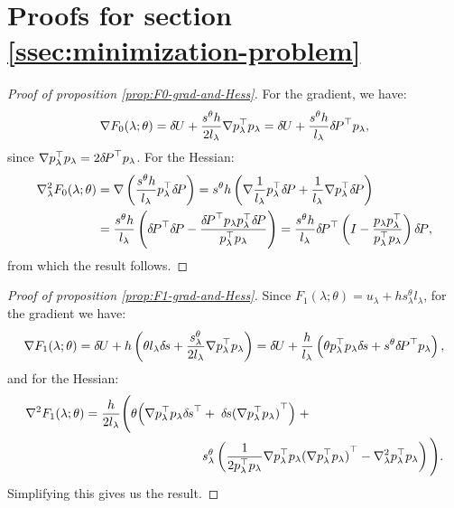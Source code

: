 \documentclass[smallcondensed]{svjour3}
\begin{document}
\section{Proofs for section\@
  \ref{ssec:minimization-problem}}\label{sec:minimization-proofs}

\begin{proof}[Proof of proposition \ref{prop:F0-grad-and-Hess}]
  For the gradient, we have:
  \begin{equation*}
    \nabla F_0(\lambda; \theta) = {\delta \hspace{-0.09em} U} + \frac{s^{\theta} h}{2 l_\lambda} \nabla p_\lambda^\top p_\lambda = {\delta \hspace{-0.09em} U} + \frac{s^{\theta} h}{l_\lambda} {\delta \hspace{-0.14em} P}^\top p_\lambda,
  \end{equation*}
  since
  $\nabla p_\lambda^\top p_\lambda = 2 {\delta \hspace{-0.14em} P}^\top
  p_\lambda$. For the Hessian:
  \begin{align*}
    \nabla^2_\lambda F_0(\lambda; \theta) &= \nabla \left(\frac{s^{\theta} h}{l_\lambda} p_\lambda^\top {\delta \hspace{-0.14em} P}\right) = s^{\theta} h \left(\nabla \frac{1}{l_\lambda} p_\lambda^\top {\delta \hspace{-0.14em} P} + \frac{1}{l_\lambda} \nabla p_\lambda^\top {\delta \hspace{-0.14em} P}\right) \\
    &= \frac{s^{\theta} h}{l_\lambda} \left({\delta \hspace{-0.14em} P}^\top {\delta \hspace{-0.14em} P} - \frac{{\delta \hspace{-0.14em} P}^\top p_\lambda p_\lambda^\top {\delta \hspace{-0.14em} P}}{p_\lambda^\top p_\lambda}\right) = \frac{s^{\theta} h}{l_\lambda} {\delta \hspace{-0.14em} P}^\top \left(I - \frac{p_\lambda p_\lambda^\top}{p_\lambda^\top p_\lambda}\right) {\delta \hspace{-0.14em} P},
  \end{align*}
  from which the result follows.
\end{proof}

\begin{proof}[Proof of proposition \ref{prop:F1-grad-and-Hess}]
  Since
  $F_1(\lambda; \theta) = u_\lambda + h s^{\theta}_\lambda l_\lambda$,
  for the gradient we have:
  \begin{equation*}
    \nabla F_1(\lambda; \theta) = {\delta \hspace{-0.09em} U} + h \left(\theta l_\lambda {\delta \hspace{-0.1em} s} + \frac{s^{\theta}_\lambda}{2l_\lambda} \nabla p_\lambda^\top p_\lambda\right) = {\delta \hspace{-0.09em} U} + \frac{h}{l_\lambda} \left(\theta p_\lambda^\top p_\lambda {\delta \hspace{-0.1em} s} + s^{\theta} {\delta \hspace{-0.14em} P}^\top p_\lambda\right),
  \end{equation*}
  and for the Hessian:
  \begin{equation*}
    \begin{aligned}
      \nabla^2 F_1(\lambda; \theta) = \frac{h}{2 l_\lambda} \Bigg(\theta \Big(\nabla p_\lambda^\top p_\lambda {\delta \hspace{-0.1em} s}^\top &+\; {\delta \hspace{-0.1em} s} {(\nabla p_\lambda^\top p_\lambda)}^\top\Big) \;+ \\
      &s^{\theta}_\lambda \left(\frac{1}{2 p_\lambda^\top p_\lambda} \nabla p_\lambda^\top p_\lambda {(\nabla p_\lambda^\top p_\lambda)}^\top - \nabla^2_\lambda p_\lambda^\top p_\lambda\right) \Bigg).
    \end{aligned}
  \end{equation*}
  Simplifying this gives us the result.
\end{proof}
\end{document}
